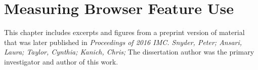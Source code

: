 \chapter{Measuring Browser Feature Use}
\label{measurement}

This chapter includes excerpts and figures from a preprint version of material
that was later published in \textit{Proceedings of 2016 IMC. Snyder, Peter;
Ansari, Laura; Taylor, Cynthia; Kanich, Chris;} The dissertation author was the
primary investigator and author of this work.







